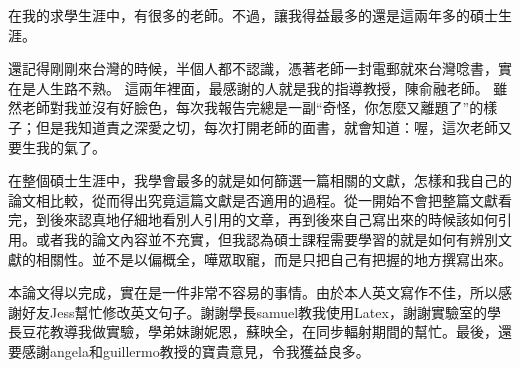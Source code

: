 \begin{acknowledgements} 

在我的求學生涯中，有很多的老師。不過，讓我得益最多的還是這兩年多的碩士生涯。

還記得剛剛來台灣的時候，半個人都不認識，憑著老師一封電郵就來台灣唸書，實在是人生路不熟。 這兩年裡面，最感謝的人就是我的指導教授，陳俞融老師。 雖然老師對我並沒有好臉色，每次我報告完總是一副“奇怪，你怎麼又離題了”的樣子；但是我知道責之深愛之切，每次打開老師的面書，就會知道：喔，這次老師又要生我的氣了。

在整個碩士生涯中，我學會最多的就是如何篩選一篇相關的文獻，怎樣和我自己的論文相比較，從而得出究竟這篇文獻是否適用的過程。從一開始不會把整篇文獻看完，到後來認真地仔細地看別人引用的文章，再到後來自己寫出來的時候該如何引用。或者我的論文內容並不充實，但我認為碩士課程需要學習的就是如何有辨別文獻的相關性。並不是以偏概全，嘩眾取寵，而是只把自己有把握的地方撰寫出來。

本論文得以完成，實在是一件非常不容易的事情。由於本人英文寫作不佳，所以感謝好友Jess幫忙修改英文句子。謝謝學長samuel教我使用Latex，謝謝實驗室的學長豆花教導我做實驗，學弟妹謝妮恩，蘇映全，在同步輻射期間的幫忙。最後，還要感謝angela和guillermo教授的寶貴意見，令我獲益良多。

\end{acknowledgements} 
